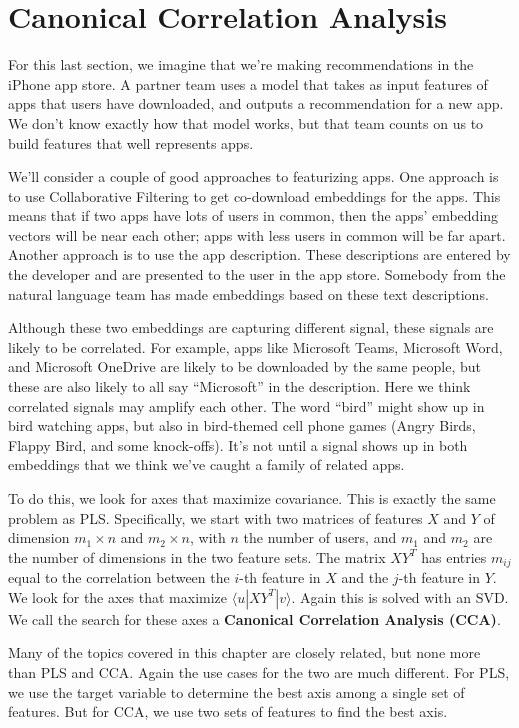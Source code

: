 \documentclass{amsbook}
\begin{document}
\section{Canonical Correlation Analysis}

For this last section, we imagine that we’re making recommendations in the iPhone app store.  A partner team uses a model that takes as input features of apps that users have downloaded, and outputs a recommendation for a new app.  We don’t know exactly how that model works, but that team counts on us to build features that well represents apps.

We’ll consider a couple of good approaches to featurizing apps.  One approach is to use Collaborative Filtering to get co-download embeddings for the apps.  This means that if two apps have lots of users in common, then the apps’ embedding vectors will be near each other; apps with less users in common will be far apart.  Another approach is to use the app description.  These descriptions are entered by the developer and are presented to the user in the app store.  Somebody from the natural language team has made embeddings based on these text descriptions.

Although these two embeddings are capturing different signal, these signals are likely to be correlated.  For example, apps like Microsoft Teams, Microsoft Word, and Microsoft OneDrive are likely to be downloaded by the same people, but these are also likely to all say “Microsoft” in the description.  Here we think correlated signals may amplify each other.  The word “bird” might show up in bird watching apps, but also in bird-themed cell phone games (Angry Birds, Flappy Bird, and some knock-offs).  It’s not until a signal shows up in both embeddings that we think we’ve caught a family of related apps.

To do this, we look for axes that maximize covariance.  This is exactly the same problem as PLS.  Specifically, we start with two matrices of features $X$ and $Y$ of dimension $m_1\times n$ and $m_2\times n$, with $n$ the number of users, and $m_1$ and $m_2$ are the number of dimensions in the two feature sets.  The matrix $XY^T$ has entries $m_{ij}$ equal to the correlation between the $i$-th feature in $X$ and the $j$-th feature in $Y$.  We look for the axes that maximize $\langle u|XY^T|v\rangle$.  Again this is solved with an SVD.  We call the search for these axes a {\bf Canonical Correlation Analysis (CCA)}.

Many of the topics covered in this chapter are closely related, but none more than PLS and CCA.  Again the use cases for the two are much different.  For PLS, we use the target variable to determine the best axis among a single set of features.  But for CCA, we use two sets of features to find the best axis.
\end{document}
